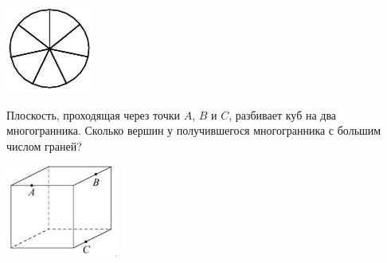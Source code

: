 \begin{class}[number=5]
\begin{listofex}
\begin{minipage}[t]{\picwidth}
			\includegraphics[align=t, width=\linewidth]{../pics/G101M8L5-5}
		\end{minipage}
		\item 
		\begin{minipage}[t]{\bodywidth}
			Плоскость, проходящая через точки \(A\), \(B\) и \(C\), разбивает куб на два многогранника. Сколько вершин у получившегося многогранника с большим числом граней?
		\end{minipage}
		\hspace{0.02\linewidth}
		\begin{minipage}[t]{\picwidth}
			\includegraphics[align=t, width=\linewidth]{../pics/G101M8L5-6}

\end{minipage}
\end{listofex}
\end{class}
